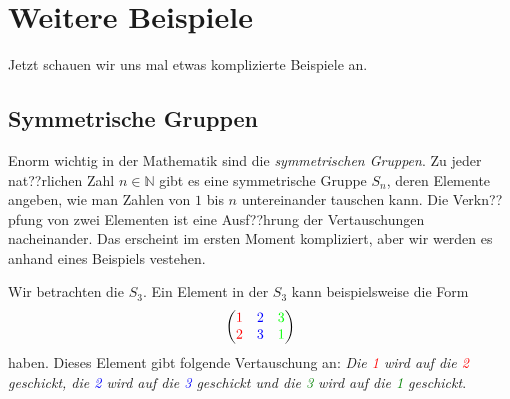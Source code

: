 \documentclass[a4paper,ngerman,12pt]{zirkelblatt1415}
\theoremstyle{definition}
\theoremstyle{plain}
\theoremstyle{remark}
\begin{document}
\section{Weitere Beispiele}

Jetzt schauen wir uns mal etwas komplizierte Beispiele an.

\subsection{Symmetrische Gruppen}

Enorm wichtig in der Mathematik sind die \textit{symmetrischen Gruppen}. Zu jeder nat??rlichen Zahl $n\in \mathbb{N}$ gibt es eine symmetrische Gruppe $S_n$, deren Elemente angeben, wie man Zahlen von $1$ bis $n$ untereinander tauschen kann. Die Verkn??pfung von zwei Elementen ist eine Ausf??hrung der Vertauschungen nacheinander. Das erscheint im ersten Moment kompliziert, aber wir werden es anhand eines Beispiels vestehen.

Wir betrachten die $S_3$. Ein Element in der $S_3$ kann beispielsweise die Form 
\begin{equation*}
\begin{pmatrix}
 \textcolor{red}{1} & \textcolor{blue}{2} & \textcolor{green}{3} \\
 \textcolor{red}{2} & \textcolor{blue}{3} & \textcolor{green}{1}
\end{pmatrix}
\end{equation*}
haben. Dieses Element gibt folgende Vertauschung an: \textit{Die \textcolor{red}{1} wird auf die \textcolor{red}{2} geschickt, die \textcolor{blue}{2} wird auf die \textcolor{blue}{3} geschickt und die \textcolor{green}{3} wird auf die \textcolor{green}{1} geschickt}.
\end{document}
